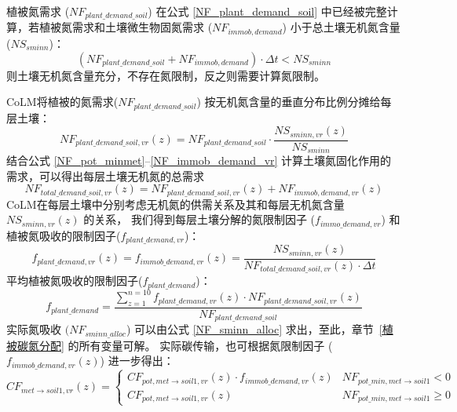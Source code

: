 植被氮需求 ($NF_{plant\_{demand\_{soil}}}$) 在公式 \eqref{NF_plant_demand_soil} 中已经被完整计算，若植被氮需求和土壤微生物固氮需求 ($NF_{immob,demand}$) 小于总土壤无机氮含量(${NS}_{sminn}$)：
\begin{equation}
    \left(NF_{plant\_{demand\_{soil}}}+NF_{immob,demand}\right)\cdot\Delta t<NS_{sminn}
\end{equation}
则土壤无机氮含量充分，不存在氮限制，反之则需要计算氮限制。

CoLM将植被的氮需求($NF_{plant\_{demand\_{soil}}}$) 按无机氮含量的垂直分布比例分摊给每层土壤：
\begin{equation}
    NF_{plant\_{demand\_{soil}},vr}(z)=NF_{plant\_{demand\_{soil}}}\cdot\frac{NS_{sminn,vr}(z)}{NS_{sminn}}
\end{equation}
结合公式 \eqref{NF_pot_minmet}--\eqref{NF_immob_demand_vr} 计算土壤氮固化作用的需求，可以得出每层土壤无机氮的总需求
\begin{equation}
    NF_{total\_{demand\_{soil}},vr}(z)=NF_{plant\_{demand\_{soil}},vr}(z)+NF_{immob,demand,vr}\left(z\right)
\end{equation}
CoLM在每层土壤中分别考虑无机氮的供需关系及其和每层无机氮含量 ${NS}_{sminn,vr}(z)$ 的关系，
我们得到每层土壤分解的氮限制因子 ($f_{immo\_{demand},vr}$) 和植被氮吸收的限制因子($f_{plant\_{demand},vr}$)：
\begin{equation}
    f_{plant\_{demand},vr}(z)=f_{immob\_{demand},vr}(z)=\frac{NS_{sminn,vr}(z)}{NF_{total\_{demand\_{soil}},vr}(z)\cdot\Delta t}
\end{equation}
平均植被氮吸收的限制因子($f_{plant\_{demand}}$)：
\begin{equation}
    f_{plant\_{demand}}=\frac{\sum_{z=1}^{n=10}{f_{plant\_{demand},vr}(z)\cdot NF_{plant\_{demand\_{soil}},vr}(z)}}{NF_{plant\_{demand\_{soil}}}}
\end{equation}
实际氮吸收 $(NF_{sminn\_{alloc}}$) 可以由公式 \eqref{NF_sminn_alloc} 求出，至此，章节~\ref{植被碳氮分配} 的所有变量可解。
实际碳传输，也可根据氮限制因子 ($f_{immob\_{demand},vr}(z)$) 进一步得出：
\begin{equation}
CF_{met \rightarrow { soil1,vr }}(z)=\left\{\begin{array}{ll}C F_{pot, met \rightarrow soil1, vr}(z) \cdot f_{{immob}\_{demand}, vr}(z) & NF_{pot\_{min}, met \rightarrow {soil1}} <0 \\ 
CF_{pot, met \rightarrow { soil1,vr }}(z) & NF_{pot\_{min}, met \rightarrow {soil1}} \geq 0
\end{array}\right.
\end{equation}
